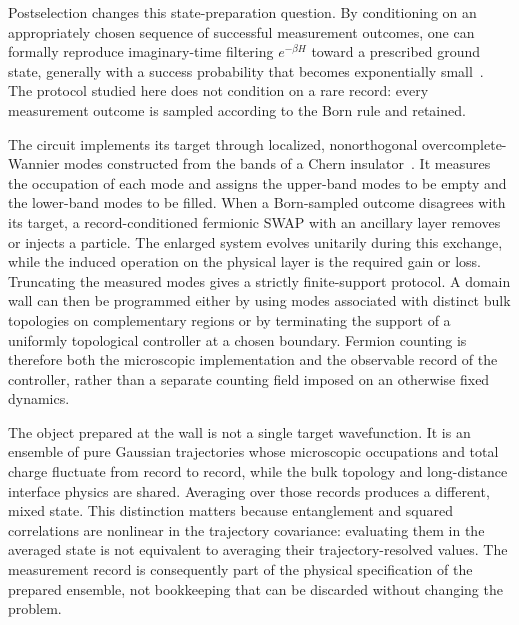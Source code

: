 \documentclass[aps,prl,twocolumn,floatfix,superscriptaddress,nofootinbib]{revtex4-2}
\begin{document}
Postselection changes this state-preparation question.  By conditioning on an appropriately chosen sequence of successful measurement outcomes, one can formally reproduce imaginary-time filtering $e^{-\beta H}$ toward a prescribed ground state, generally with a success probability that becomes exponentially small~\cite{LiZou2023,GarrattAltman2024}.  The protocol studied here does not condition on a rare record: every measurement outcome is sampled according to the Born rule and retained.

The circuit implements its target through localized, nonorthogonal overcomplete-Wannier modes constructed from the bands of a Chern insulator~\cite{BhuiyanPanJian2026}.  It measures the occupation of each mode and assigns the upper-band modes to be empty and the lower-band modes to be filled.  When a Born-sampled outcome disagrees with its target, a record-conditioned fermionic SWAP with an ancillary layer removes or injects a particle.  The enlarged system evolves unitarily during this exchange, while the induced operation on the physical layer is the required gain or loss.  Truncating the measured modes gives a strictly finite-support protocol.  A domain wall can then be programmed either by using modes associated with distinct bulk topologies on complementary regions or by terminating the support of a uniformly topological controller at a chosen boundary.  Fermion counting is therefore both the microscopic implementation and the observable record of the controller, rather than a separate counting field imposed on an otherwise fixed dynamics.

The object prepared at the wall is not a single target wavefunction.  It is an ensemble of pure Gaussian trajectories whose microscopic occupations and total charge fluctuate from record to record, while the bulk topology and long-distance interface physics are shared.  Averaging over those records produces a different, mixed state.  This distinction matters because entanglement and squared correlations are nonlinear in the trajectory covariance: evaluating them in the averaged state is not equivalent to averaging their trajectory-resolved values.  The measurement record is consequently part of the physical specification of the prepared ensemble, not bookkeeping that can be discarded without changing the problem.
\end{document}
